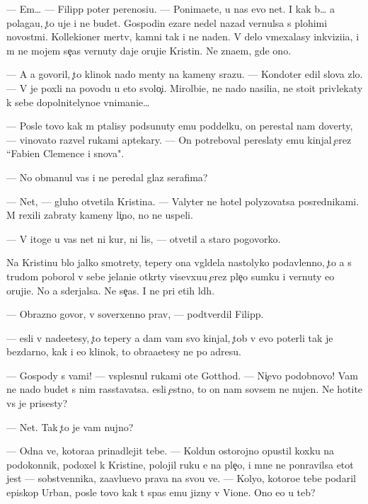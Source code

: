 \documentclass[10pt]{book}
\begin{document}
— Em… — Filipp poter perenosi{\q}u. — Ponima{\y}ete, u nas {\y}evo net. I kak b{\yi}… {\y}a polaga{\y}u, {\c}to uje i ne budet. Gospodin {\C}ezare nedel{\iu} nazad vernulsa s plohimi novost{\ia}mi. Kollek{\q}ioner mertv, kamni tak i ne na{\y}den{\yi}. V delo vmexalasy inkvizi{\q}i{\y}a, i m{\yi} ne mojem se{\y}{\c}as vernuty daje oruji{\y}e Kristin{\yi}. Ne zna{\y}em, gde ono.

— A {\y}a govoril, {\c}to klinok nado men{\ia}ty na kameny srazu. — Kondot{\y}er {\q}edil slova zlo. — V{\yi} je poxli na povodu u eto{\y} svolo{\c}i. Mirol{\iu}bi{\y}e, ne nado nasili{\y}a, ne sto{\y}it privlekaty k sebe dopolnitelyno{\y}e vnimani{\y}e…

— Posle tovo kak m{\yi} p{\yi}talisy podsunuty {\y}emu poddelku, on perestal nam dover{\ia}ty, — vinovato razvel rukami aptekary. — On potreboval pereslaty {\y}emu kinjal {\c}erez ``Fabien Clemence i s{\yi}nov{\y}a".

— No obmanul vas i ne peredal glaz serafima?

— Net, — gluho otvetila Kristina. — Valyter ne hotel polyzovatsa posrednikami. M{\yi} rexili zabraty kameny li{\c}no, no ne uspeli.

— V itoge u vas net ni kur, ni lis{\yi}, — otvetil {\y}a staro{\y} pogovorko{\y}.

Na Kristinu b{\yi}lo jalko smotrety, tepery ona v{\yi}gl{\ia}dela nastolyko podavlenno{\y}, {\c}to {\y}a s trudom poborol v sebe jelani{\y}e otkr{\yi}ty visevxu{\y}u {\c}erez ple{\c}o sumku i vernuty {\y}e{\y}o oruji{\y}e. No {\y}a sderjalsa. Ne se{\y}{\c}as. I ne pri etih l{\iu}d{\ia}h.

— Obrazno govor{\ia}, v{\yi} soverxenno prav{\yi}, — podtverdil Filipp.

— {\Y}esli v{\yi} nade{\y}etesy, {\c}to tepery {\y}a dam vam svo{\y} kinjal, {\c}tob{\yi} v{\yi} {\y}evo poter{\ia}li tak je bezdarno, kak i {\y}e{\y}o klinok, to obra{\x}a{\y}etesy ne po adresu.

— Gospody s vami! — vsplesnul rukami ote{\q} Gotthod. — Ni{\c}evo podobnovo! Vam ne nado budet s nim rasstavatsa. {\Y}esli {\c}estno, to on nam sovsem ne nujen. Ne hotite vs{\e} je prisesty?

— Net. Tak {\c}to je vam nujno?

— Odna ve{\x}, kotora{\y}a prinadlejit tebe. — Koldun ostorojno opustil koxku na podokonnik, podoxel k Kristine, polojil ruku {\y}e{\y} na ple{\c}o, i mne ne ponravilsa etot jest — sobstvennika, za{\y}avl{\ia}{\y}u{\x}evo prava na svo{\y}u ve{\x}. — Koly{\q}o, kotoro{\y}e tebe podaril {\y}episkop Urban, posle tovo kak t{\yi} spas {\y}emu jizny v Vione. Ono {\y}e{\x}o u teb{\ia}?
\end{document}
